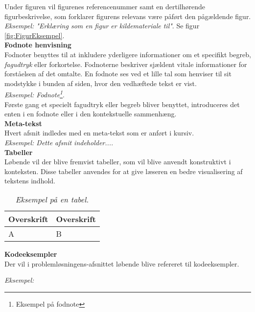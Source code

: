 Under figuren vil figurenes referencenummer samt en dertilhørende figurbeskrivelse, som forklarer figurens relevans være påført den pågældende figur. \\ 
\textit{Eksempel: "Erklæring som en figur er kildemateriale til"}. Se figur \ref{fig:FigurEksempel}.\\
{\bf Fodnote henvisning}\\
Fodnoter benyttes til at inkludere yderligere informationer om et specifikt begreb, \textit{fagudtryk} eller forkortelse. Fodnoterne beskriver sjældent vitale informationer for forståelsen af det omtalte. En fodnote ses ved et lille tal som henviser til sit modstykke i bunden af siden, hvor den vedhæftede tekst er vist. \\

\textit{Eksempel: Fodnote\footnote{Eksempel på fodnote}}.\\

Første gang et specielt fagudtryk eller begreb bliver benyttet, introduceres det enten i en fodnote eller i den kontekstuelle sammenhæng. \\

{\bf Meta-tekst}\\
Hvert afsnit indledes med en meta-tekst som er anført i kursiv. \\

\textit{Eksempel: Dette afsnit indeholder...}. \\

{\bf Tabeller}\\
Løbende vil der blive fremvist tabeller, som vil blive anvendt konstruktivt i konteksten. Disse tabeller anvendes for at give læseren en bedre visualisering af tekstens indhold.

\begin{table}[h]
    \centering
    \begin{tabular}{ l | l }
        Overskrift & Overskrift \\
        \hline \hline
        A & B \\
    \end{tabular}
    \caption{\textit{Eksempel på en tabel. \tabelgroup}}
    \label{tab:abc}
\end{table}

{\bf Kodeeksempler}\\
Der vil i problemløsningens-afsnittet løbende blive refereret til kodeeksempler. 

\textit{Eksempel:}




